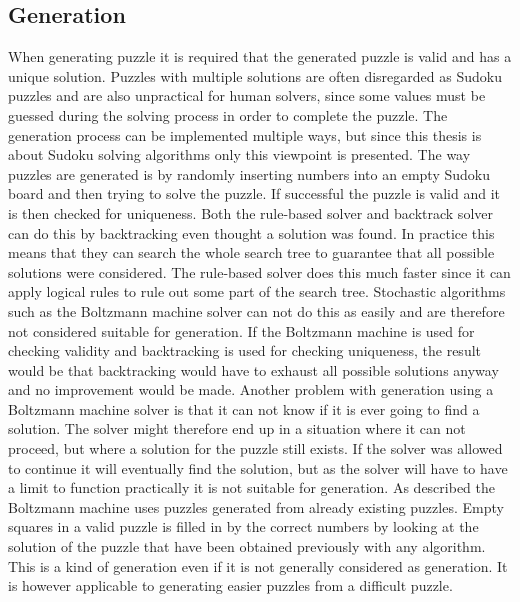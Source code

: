\documentclass[a4paper,11pt]{kth-mag}
\begin{document}
\subsection{Generation}
When generating puzzle it is required that the generated puzzle is valid and has a unique solution.
Puzzles with multiple solutions are often disregarded as Sudoku puzzles and are also unpractical for human solvers, since some values must be guessed during the solving process in order to complete the puzzle.
The generation process can be implemented multiple ways, but since this thesis is about Sudoku solving algorithms only this viewpoint is presented.
The way puzzles are generated is by randomly inserting numbers into an empty Sudoku board and then trying to solve the puzzle. 
If successful the puzzle is valid and it is then checked for uniqueness. 
Both the rule-based solver and backtrack solver can do this by backtracking even thought a solution was found.
In practice this means that they can search the whole search tree to guarantee that all possible solutions were considered.
The rule-based solver does this much faster since it can apply logical rules to rule out some part of the search tree.
Stochastic algorithms such as the Boltzmann machine solver can not do this as easily and are therefore not considered suitable for generation.
If the Boltzmann machine is used for checking validity and backtracking is used for checking uniqueness, the result would be that backtracking would have to exhaust all possible solutions anyway and no improvement would be made.
Another problem with generation using a Boltzmann machine solver is that it can not know if it is ever going to find a solution.
The solver might therefore end up in a situation where it can not proceed, but where a solution for the puzzle still exists.
If the solver was allowed to continue it will eventually find the solution, but as the solver will have to have a limit to function practically it is not suitable for generation.
As described the Boltzmann machine uses puzzles generated from already existing puzzles.
Empty squares in a valid puzzle is filled in by the correct numbers by looking at the solution of the puzzle that have been obtained previously with any algorithm.
This is a kind of generation even if it is not generally considered as generation.
It is however applicable to generating easier puzzles from a difficult puzzle.
\end{document}
